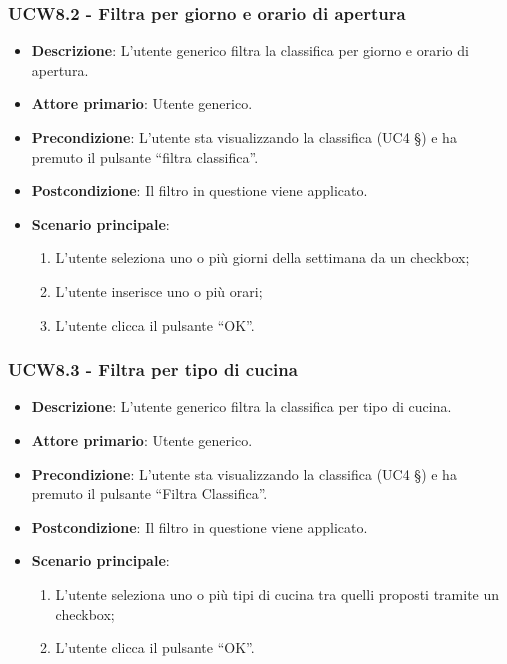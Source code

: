 \subsubsection{UCW8.2 - Filtra per giorno e orario di apertura}
\begin{itemize}
	\item \textbf{Descrizione}: L'utente generico filtra la classifica per giorno e orario di apertura.
    \item \textbf{Attore primario}: Utente generico.
    \item \textbf{Precondizione}: L’utente sta visualizzando la classifica (UC4 §) e ha premuto il pulsante “filtra classifica”.
    \item \textbf{Postcondizione}: Il filtro in questione viene applicato.
    \item \textbf{Scenario principale}: 
    \begin{enumerate}
        \item L’utente seleziona uno o più giorni della settimana da un checkbox;
        \item L’utente inserisce uno o più orari;
        \item L’utente clicca il pulsante “OK”.
    \end{enumerate}
\end{itemize}

\subsubsection{UCW8.3 - Filtra per tipo di cucina}
\begin{itemize}
	\item \textbf{Descrizione}: L'utente generico filtra la classifica per tipo di cucina.
    \item \textbf{Attore primario}: Utente generico.
    \item \textbf{Precondizione}: L’utente sta visualizzando la classifica (UC4 §) e ha premuto il pulsante “Filtra Classifica”.
    \item \textbf{Postcondizione}: Il filtro in questione viene applicato.
    \item \textbf{Scenario principale}: 
    \begin{enumerate}
        \item L’utente seleziona uno o più tipi di cucina tra quelli proposti tramite un checkbox;
        \item L’utente clicca il pulsante “OK”.
    \end{enumerate}
\end{itemize}

